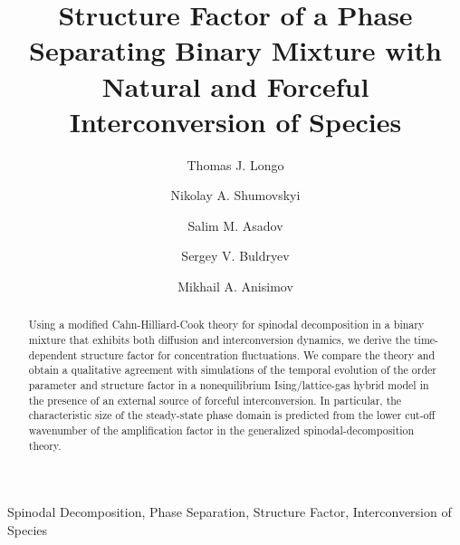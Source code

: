 \documentclass[5p,twocolumn]{elsarticle}
\begin{document}
\begin{frontmatter}

\title{Structure Factor of a Phase Separating Binary Mixture with Natural and Forceful Interconversion of Species}

\author[1]{Thomas J. Longo}
\author[2]{Nikolay A. Shumovskyi}
\author[1,3]{Salim M. Asadov}
\author[2,4]{Sergey V. Buldryev}
\author[1,5]{Mikhail A. Anisimov}


\address[1]{Institute for Physical Science and Technology, University of Maryland, College Park, MD 20742, USA}
\address[2]{Department of Physics, Boston University, Boston, MA 02215, USA}
\address[3]{Institute of Catalysis and Inorganic Chemistry, Azerbaijan National Academy of Sciences, Baku, AZ1143, AZR}
\address[4]{Department of Physics, Yeshiva University, New York, NY 10033, USA}
\address[5]{Department of Chemical and Biomolecular Engineering, University of Maryland, College Park, MD 20742, USA}

\begin{abstract}
Using a modified Cahn-Hilliard-Cook theory for spinodal decomposition in a binary mixture that exhibits both diffusion and interconversion dynamics, we derive the time-dependent structure factor for concentration  fluctuations. We compare the theory and obtain a qualitative agreement with simulations of the temporal evolution of the order parameter and structure factor in a nonequilibrium Ising/lattice-gas hybrid model in the presence of an external source of forceful interconversion. In particular, the characteristic size of the steady-state phase domain is predicted from the lower cut-off wavenumber of the amplification factor in the generalized spinodal-decomposition theory.
\end{abstract}

\begin{keyword}
Spinodal Decomposition, Phase Separation, Structure Factor, Interconversion of Species
\end{keyword}

\end{frontmatter}
\end{document}
